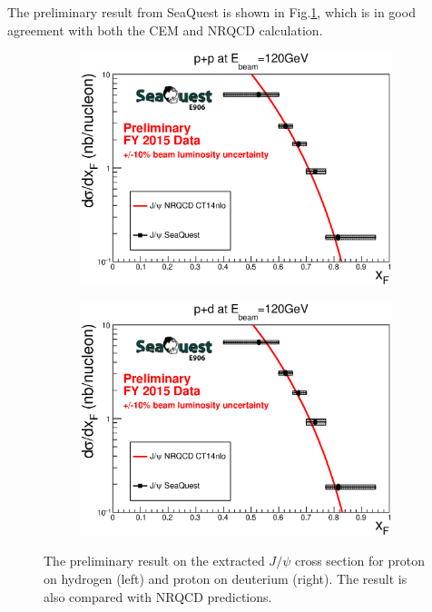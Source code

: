 \documentclass[10pt, a4paper,final]{article}
\begin{document}
The preliminary result from SeaQuest is shown in Fig.\ref{fig:abs_cs_NRQCD},
which is in good agreement with both the CEM and NRQCD calculation.
\begin{figure}[htbp!]
	\centering
	\begin{subfigure}{0.45\linewidth}
		\includegraphics[width=0.9\linewidth]{jpsi_xF_LH2}
	\end{subfigure}
	\begin{subfigure}{0.45\linewidth}
		\includegraphics[width=0.9\linewidth]{jpsi_xF_LD2}
	\end{subfigure}
	\caption{The preliminary result on the extracted $J/\psi$ cross section for
		proton on hydrogen (left) and proton on deuterium (right). The result is
		also compared with NRQCD predictions.}
	\label{fig:abs_cs_NRQCD}
\end{figure}
\end{document}
